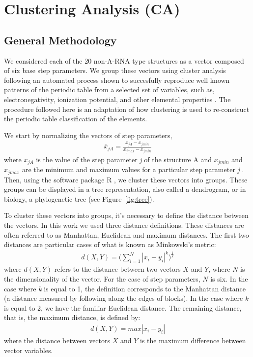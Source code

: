 \chapter{Clustering Analysis (CA)}
\label{appendix_a}

\section{General Methodology}
We considered  each of  the 20 non-A-RNA  type structures as  a vector
composed of  six base step  parameters.  We group these  vectors using
cluster analysis  following an automated process  shown to succesfully
reproduce well  known patterns of  the periodic table from  a selected
set  of variables, such  as, electronegativity,  ionization potential,
and  other elemental  properties  \cite{restrepo2004}.  The  procedure
followed  here  is  an  adaptation   of  how  clustering  is  used  to
re-construct the periodic table classification of the elements.

We start by normalizing the vectors of step parameters,
\begin{gather}
\label{eq:normalization}  
\overline{x}_{jA}=\frac{x_{jA}-x_{jmin}}{x_{jmax}-x_{jmin}}
\end{gather}
where ${x}_{jA}$ is the value  of the step parameter \textit{j} of the
structure A and $x_{jmin}$ and  $x_{jmax}$ are the minimum and maximum
values for a particular step parameter \textit{j} \cite{restrepo2006}.
Then,  using  the  software  package \textsf{R}  \cite{ihaka1996},  we
cluster these vectors into groups.  These groups can be displayed in a
tree  representation,  also called  a  dendrogram,  or  in biology,  a
phylogenetic tree (see Figure~\ref{fig:tree}).

To cluster  these vectors into groups,  it's necessary  to define the
distance between  the vectors. In  this work we used  three distance
definitions.   These distances  are  often referred  to as  Manhattan,
Euclidean  and   maximum  distances.  The  first   two  distances  are
particular cases of what is known as Minkowski's metric:
\begin{gather}
d(X,Y)= \Big( \sum_{i=1}^N |x_i-y_i|^k \Big)^\frac{1}{k}
\end{gather}
where $d(X,Y)$ refers to the distance between two vectors $X$ and $Y$,
where $N$ is  the dimensionality of the vector.  For  the case of step
parameters, $N$ is  six.  In the case where \textit{k}  is equal to 1,
the  definition  corresponds to  the  Manhattan  distance (a  distance
measured by  following along the edges  of blocks). In  the case where
\textit{k} is equal to 2, we have the familiar Euclidean distance. The
remaining distance, that is, the maximum distance, is defined by:
\begin{gather}
d(X,Y) = max |x_{i}-y_{i}|
\end{gather}
where  the  distance  between  vectors  $X$ and  $Y$  is  the  maximum
difference between vector variables.

